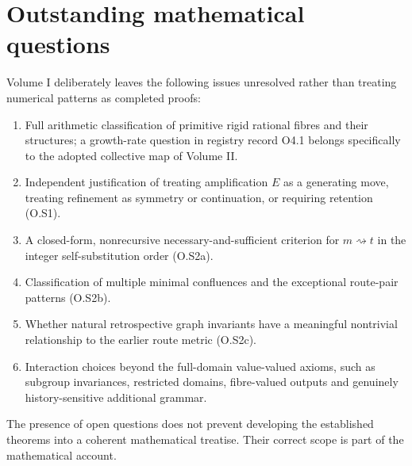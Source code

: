 \documentclass[11pt,oneside,openany]{book}
\theoremstyle{definition}
\theoremstyle{remark}
\begin{document}
\chapter{Outstanding mathematical questions}\label{app:open}
Volume I deliberately leaves the following issues unresolved rather than treating numerical patterns as completed proofs:
\begin{enumerate}
\item Full arithmetic classification of primitive rigid rational fibres and their structures; a growth-rate question in registry record O4.1 belongs specifically to the adopted collective map of Volume II.
\item Independent justification of treating amplification \(E\) as a generating move, treating refinement as symmetry or continuation, or requiring retention (O.S1).
\item A closed-form, nonrecursive necessary-and-sufficient criterion for \(m\rightsquigarrow t\) in the integer self-substitution order (O.S2a).
\item Classification of multiple minimal confluences and the exceptional route-pair patterns (O.S2b).
\item Whether natural retrospective graph invariants have a meaningful nontrivial relationship to the earlier route metric (O.S2c).
\item Interaction choices beyond the full-domain value-valued axioms, such as subgroup invariances, restricted domains, fibre-valued outputs and genuinely history-sensitive additional grammar.
\end{enumerate}
The presence of open questions does not prevent developing the established theorems into a coherent mathematical treatise. Their correct scope is part of the mathematical account.
\end{document}
